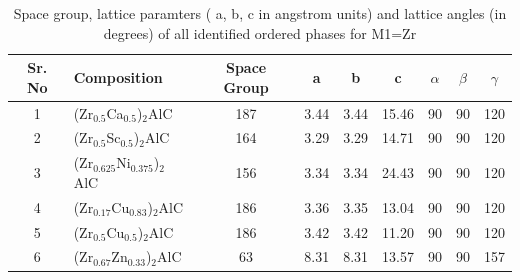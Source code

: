 \documentclass[preprint,amsmath,amssymb,aps, prb,showkeys]{revtex4-1}
\begin{document}
\begin{table}[htp!]
\centering
\setlength{\tabcolsep}{0.2cm}
\setlength\extrarowheight{6pt}
\begin{tabular}{clccccccc}
\hline
Sr. No & Composition                       & Space Group & a     & b     & c     & $\alpha$ & $\beta$ & $\gamma$ \\
\hline \hline

1     & (Zr$_{0.5}$Ca$_{0.5}$)$_2$AlC     & 187         & 3.44  & 3.44  & 15.46 & 90       & 90      & 120      \\
2     & (Zr$_{0.5}$Sc$_{0.5}$)$_2$AlC     & 164         & 3.29  & 3.29  & 14.71 & 90       & 90      & 120      \\
3     & (Zr$_{0.625}$Ni$_{0.375}$)$_2$AlC & 156         & 3.34  & 3.34  & 24.43 & 90       & 90      & 120      \\
4     & (Zr$_{0.17}$Cu$_{0.83}$)$_2$AlC   & 186         & 3.36  & 3.35  & 13.04 & 90       & 90      & 120      \\
5     & (Zr$_{0.5}$Cu$_{0.5}$)$_2$AlC     & 186         & 3.42  & 3.42  & 11.20 & 90       & 90      & 120      \\
6     & (Zr$_{0.67}$Zn$_{0.33}$)$_2$AlC   & 63          & 8.31  & 8.31  & 13.57 & 90       & 90      & 157      \\
\hline \hline
\end{tabular}
\caption{Space group, lattice paramters ( a, b, c in angstrom units) and lattice angles (in degrees)  of all identified ordered phases for M1=Zr}
\end{table}
\end{document}
